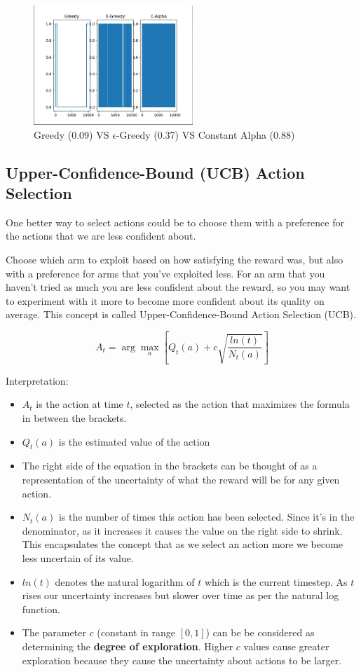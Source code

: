 \begin{figure}[H]
    \centering
    \includegraphics[height=4.5cm]{Pictures/deep-reinforcement-learning/greedy-vs-e-greedy-vs-c-alpha.jpg}
    \caption{Greedy (0.09) VS $\epsilon$-Greedy (0.37) VS Constant Alpha (0.88)}
\end{figure}

\subsection{Upper-Confidence-Bound (UCB) Action Selection \cite{medium-numsmt2-rl-ch2-part-4}}\label{MAB: Upper-Confidence-Bound (UCB) Action Selection}

One better way to select actions could be to choose them with a preference for the actions that we are less confident about.

Choose which arm to exploit based on how satisfying the reward was, but also with a preference for arms that you’ve exploited less. For an arm that you haven’t tried as much you are less confident about the reward, so you may want to experiment with it more to become more confident about its quality on average. This concept is called Upper-Confidence-Bound Action Selection (UCB).

\[
    A_t = \arg\max_a \left[ Q_t(a) + c \sqrt{\displaystyle\frac{ln(t)}{N_t(a)}} \right]
\]

Interpretation:
\begin{itemize}
    \item $A_t$ is the action at time $t$, selected as the action that maximizes the formula in between the brackets.
    \item $Q_t(a)$ is the estimated value of the action
    \item The right side of the equation in the brackets can be thought of as a representation of the uncertainty of what the reward will be for any given action.
    \item $N_t(a)$ is the number of times this action has been selected. Since it’s in the denominator, as it increases it causes the value on the right side to shrink. This encapsulates the concept that as we select an action more we become less uncertain of its value.
    \item $ln(t)$ denotes the natural logarithm of $t$ which is the current timestep. As $t$ rises our uncertainty increases but slower over time as per the natural log function.
    \item The parameter $c$ (constant in range $[0, 1]$) can be be considered as determining the \textbf{degree of exploration}. Higher $c$ values cause greater exploration because they cause the uncertainty about actions to be larger.
\end{itemize}


